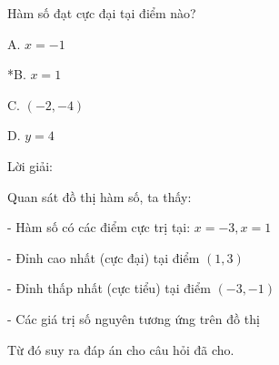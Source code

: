 \documentclass[a4paper,12pt]{article}
\begin{document}
Hàm số đạt cực đại tại điểm nào?

A. \(x=-1\)

*B. \(x=1\)

C. \((-2,-4)\)

D. \(y=4\)

Lời giải:


            Quan sát đồ thị hàm số, ta thấy:

- Hàm số có các điểm cực trị tại: \(x = -3, x = 1\)

- Đỉnh cao nhất (cực đại) tại điểm \((1, 3)\)

- Đỉnh thấp nhất (cực tiểu) tại điểm \((-3, -1)\)

- Các giá trị số nguyên tương ứng trên đồ thị

Từ đó suy ra đáp án cho câu hỏi đã cho.
\end{document}
